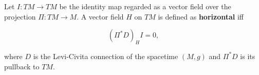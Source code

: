 Let $I: TM \to TM$ be the identity map regarded as a vector field over the projection $\Pi: TM \to M$. A vector field $H$ on $TM$ is defined as \textbf{horizontal} iff

$$(\Pi^* D)_H I = 0,$$

where $D$ is the Levi-Civita connection of the spacetime $(M, g)$ and $\Pi^* D$ is its pullback to $TM$.
